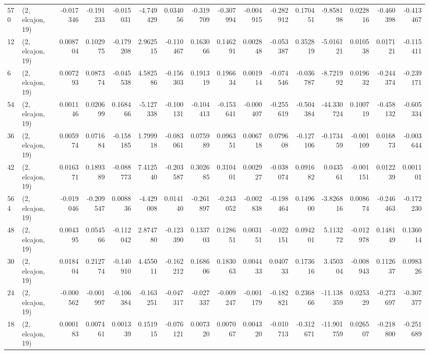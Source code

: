 \begin{tabular}{llrrrrrrrrrrrrrr}
570 &  (2, elcajon, 19) &  -0.017346 & -0.191233 & -0.015031 &   -4.749429 &  0.034056 &  -0.319709 &  -0.307994 & -0.004915 & -0.282912 &  0.170451 &   -9.858198 &  0.022816 &  -0.460398 &  -0.413467 \\
12  &  (2, elcajon, 19) &   0.008704 &  0.102975 & -0.179208 &    2.962515 & -0.110467 &   0.163066 &   0.146291 &  0.002848 & -0.053387 &  0.352819 &   -5.016121 &  0.010538 &   0.017121 &  -0.115411 \\
6   &  (2, elcajon, 19) &   0.007293 &  0.087374 & -0.045538 &    4.582586 & -0.156303 &   0.191319 &   0.196634 &  0.001914 & -0.074546 & -0.036787 &   -8.721992 &  0.019632 &  -0.244374 &  -0.239171 \\
54  &  (2, elcajon, 19) &   0.001146 &  0.020699 &  0.168466 &   -5.127338 & -0.100131 &  -0.104413 &  -0.153641 & -0.000407 & -0.255619 & -0.504384 &  -44.330724 &  0.100719 &  -0.458132 &  -0.605334 \\
36  &  (2, elcajon, 19) &   0.005974 &  0.071684 & -0.158185 &    1.799918 & -0.083061 &   0.075989 &   0.096351 &  0.006718 &  0.079608 & -0.127106 &   -0.173459 & -0.001109 &   0.016873 &  -0.003644 \\
42  &  (2, elcajon, 19) &   0.016371 &  0.189389 & -0.088773 &    7.412540 & -0.203587 &   0.302685 &   0.310401 &  0.002927 & -0.038074 &  0.091682 &    0.043561 & -0.001151 &   0.012239 &   0.001101 \\
564 &  (2, elcajon, 19) &  -0.019046 & -0.209547 &  0.008836 &   -4.429008 &  0.014140 &  -0.261897 &  -0.243052 & -0.002838 & -0.198464 &  0.149600 &   -3.826816 &  0.008674 &  -0.246463 &  -0.172230 \\
48  &  (2, elcajon, 19) &   0.004395 &  0.054566 & -0.112042 &    2.874780 & -0.123390 &   0.133703 &   0.128651 &  0.003151 & -0.022151 &  0.094201 &    5.113272 & -0.012978 &   0.148149 &   0.136014 \\
30  &  (2, elcajon, 19) &   0.018404 &  0.212774 & -0.140910 &    4.455011 & -0.162212 &   0.168606 &   0.183063 &  0.004433 &  0.040733 &  0.173616 &    3.450304 & -0.008943 &   0.112637 &   0.098326 \\
24  &  (2, elcajon, 19) &  -0.000562 & -0.001997 & -0.106384 &   -0.163251 & -0.047317 &  -0.027337 &  -0.009247 & -0.001179 & -0.182821 &  0.236866 &  -11.138359 &  0.025329 &  -0.273697 &  -0.307377 \\
18  &  (2, elcajon, 19) &   0.000183 &  0.007461 &  0.001339 &    0.151915 & -0.076121 &   0.007320 &   0.007067 &  0.004320 & -0.010713 & -0.312671 &  -11.901759 &  0.026507 &  -0.218800 &  -0.251689 \\

\end{tabular}
